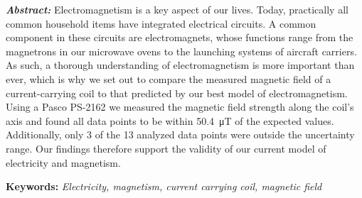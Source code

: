 \noindent
\textbf{\textit{Abstract:}}
Electromagnetism is a key aspect of our lives. Today, practically all common household items have integrated electrical circuits. A common component in these circuits are electromagnets, whose functions range from the magnetrons in our microwave ovens to the launching systems of aircraft carriers. As such, a thorough understanding of electromagnetism is more important than ever, which is why we set out to compare the measured magnetic field of a current-carrying coil to that predicted by our best model of electromagnetism. Using a Pasco PS-2162 we measured the magnetic field strength along the coil's axis and found all data points to be within \SI{50.4}{\micro\tesla} of the expected values. Additionally, only 3 of the 13 analyzed data points were outside the uncertainty range. Our findings therefore support the validity of our current model of electricity and magnetism.

\begin{center}
    \textbf{Keywords:} \textit{Electricity, magnetism, current carrying coil, magnetic field}
\end{center}